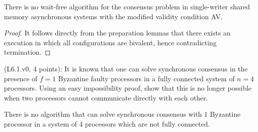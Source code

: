 \begin{theorem}
There is no wait-free algorithm for the consensus problem in single-writer shared memory
asynchronous systems with the modified validity condition AV.
\end{theorem}

\begin{proof}
It follows directly from the preparation lemmas that there exists an execution in which
all configurations are bivalent, hence contradicting termination.
\end{proof}


\begin{Exc}{(L6.1.v0, 4 points):}
It is known that one can solve synchronous consensus
in the presence of $f=1$ Byzantine faulty processors
in a fully connected system of $n=4$ processors. Using an easy
impossibility proof, show that this is no longer possible when
two processors cannot communicate directly with each other.
\end{Exc}

\begin{theorem}
There is no algorithm that can solve synchronous consensus with $1$ Byzantine
processor in a system of $4$ processors which are not fully connected.
\end{theorem}

